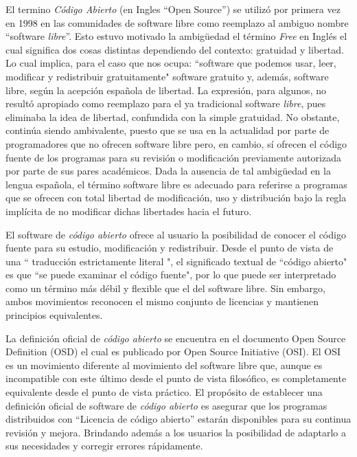 El termino \textit{Código Abierto} (en Ingles ``Open Source'') se
utilizó por primera vez en 1998 en las comunidades de software libre
como reemplazo al ambiguo nombre ``software \textit{libre}''. Esto
estuvo motivado la ambigüedad el término \textit{Free} en Inglés el
cual significa dos cosas distintas dependiendo del contexto: gratuidad
y libertad. Lo cual implica, para el caso que nos ocupa: ``software
que podemos usar, leer, modificar y redistribuir gratuitamente"
software gratuito y, además, software libre, según la acepción
española de libertad. La expresión, para algunos, no resultó apropiado
como reemplazo para el ya tradicional software \textit{libre}, pues
eliminaba la idea de libertad, confundida con la simple gratuidad. No
obstante, continúa siendo ambivalente, puesto que se usa en la
actualidad por parte de programadores que no ofrecen software libre
pero, en cambio, sí ofrecen el código fuente de los programas para su
revisión o modificación previamente autorizada por parte de sus pares
académicos. Dada la ausencia de tal ambigüedad en la lengua española,
el término software libre es adecuado para referirse a programas que
se ofrecen con total libertad de modificación, uso y distribución bajo
la regla implícita de no modificar dichas libertades hacia el futuro.

El software de \textit{código abierto} ofrece al usuario la
posibilidad de conocer el código fuente para su estudio, modificación
y redistribuir. Desde el punto de vista de una `` traducción
estrictamente literal ", el significado textual de ``código abierto"
es que ``se puede examinar el código fuente", por lo que puede ser
interpretado como un término más débil y flexible que el del software
libre.  Sin embargo, ambos movimientos reconocen el mismo conjunto de
licencias y mantienen principios equivalentes.

La definición oficial de \textit{código abierto} se encuentra en el
documento Open Source Definition (OSD) el cual es publicado por Open
Source Initiative (OSI). El OSI es un movimiento diferente al
movimiento del software libre que, aunque es incompatible con este
último desde el punto de vista filosófico, es completamente
equivalente desde el punto de vista práctico. El propósito de
establecer una definición oficial de software de \textit{código
  abierto} es asegurar que los programas distribuidos con ``Licencia
de código abierto'' estarán disponibles para su continua revisión y
mejora. Brindando además a los usuarios la posibilidad de adaptarlo a
sus necesidades y corregir errores rápidamente.


